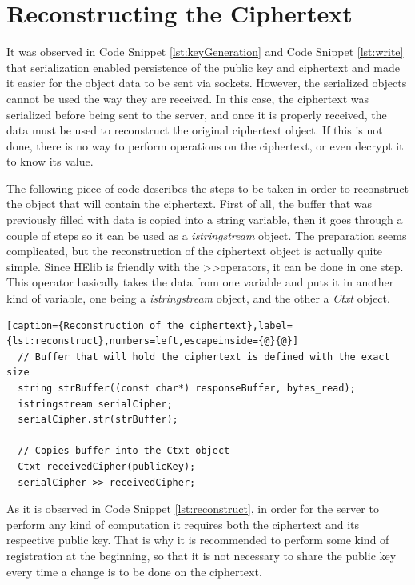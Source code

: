 \section{{Reconstructing the Ciphertext}}

It was observed in Code Snippet \ref{lst:keyGeneration}  and Code Snippet \ref{lst:write} that serialization enabled persistence of the public key and ciphertext and made it easier for the object data to be sent via sockets. However, the serialized objects cannot be used the way they are received. In this case, the ciphertext was serialized before being sent to the server, and once it is properly received, the data must be used to reconstruct the original ciphertext object.
If this is not done, there is no way to perform operations on the ciphertext, or even decrypt it to know its value.

The following piece of code describes the steps to be taken in order to reconstruct the object that will contain the ciphertext. First of all, the buffer that was previously filled with data is copied into a string variable, then it goes through a couple of steps so it can be used as a \textit{istringstream} object. The preparation seems complicated, but the reconstruction of the ciphertext object is actually quite simple. Since HElib is friendly with the \textgreater\textgreater operators, it can be done in one step. This operator basically takes the data from one variable and puts it in another kind of variable, one being a \textit{istringstream} object, and the other a \textit{Ctxt} object.

\begin{lstlisting}[caption={Reconstruction of the ciphertext},label={lst:reconstruct},numbers=left,escapeinside={@}{@}]
  // Buffer that will hold the ciphertext is defined with the exact size
  string strBuffer((const char*) responseBuffer, bytes_read);
  istringstream serialCipher;
  serialCipher.str(strBuffer);

  // Copies buffer into the Ctxt object
  Ctxt receivedCipher(publicKey);
  serialCipher >> receivedCipher;
\end{lstlisting}

As it is observed in Code Snippet \ref{lst:reconstruct}, in order for the server to perform any kind of computation it requires both the ciphertext and its respective public key. That is why it is recommended to perform some kind of registration at the beginning, so that it is not necessary to share the public key every time a change is to be done on the ciphertext. 

